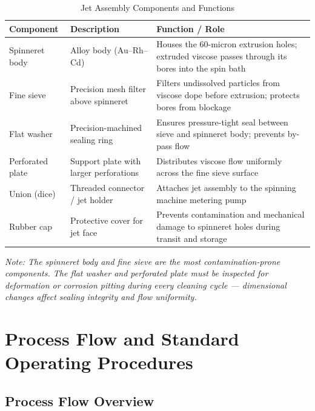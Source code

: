 \documentclass{book}
\begin{document}
\begin{table}[H]
  \centering
  \caption{Jet Assembly Components and Functions}
  \label{tab:components}
  \begin{tabular}{L{3cm} L{4cm} L{6cm}}
    \toprule
    \color{white}\textbf{Component} & \color{white}\textbf{Description} & \color{white}\textbf{Function / Role} \\
    \midrule
    Spinneret body   & Alloy body (Au--Rh--Cd) & Houses the 60-micron extrusion holes; extruded viscose passes through its bores into the spin bath \\
    Fine sieve       & Precision mesh filter above spinneret & Filters undissolved particles from viscose dope before extrusion; protects bores from blockage \\
    Flat washer      & Precision-machined sealing ring & Ensures pressure-tight seal between sieve and spinneret body; prevents by-pass flow \\
    Perforated plate & Support plate with larger perforations & Distributes viscose flow uniformly across the fine sieve surface \\
    Union (dice)     & Threaded connector / jet holder & Attaches jet assembly to the spinning machine metering pump \\
    Rubber cap       & Protective cover for jet face & Prevents contamination and mechanical damage to spinneret holes during transit and storage \\
    \bottomrule
  \end{tabular}
\end{table}

\begin{infobox}
\textit{Note: The spinneret body and fine sieve are the most contamination-prone components. The flat washer and perforated plate must be inspected for deformation or corrosion pitting during every cleaning cycle --- dimensional changes affect sealing integrity and flow uniformity.}
\end{infobox}

\chapter{Process Flow and Standard Operating Procedures}

\section{Process Flow Overview}
\end{document}
